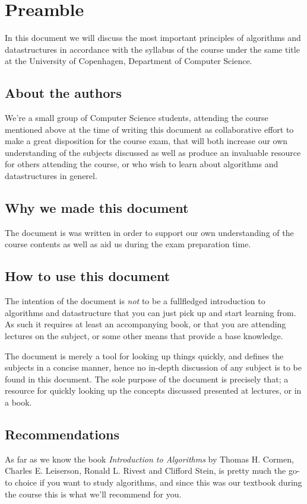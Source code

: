 
\newpage
\pagestyle{fancy}

\chapter{Preamble}
In this document we will discuss the most important principles of algorithms
and datastructures in accordance with the syllabus of the course under the
same title at the University of Copenhagen, Department of Computer Science.

\section*{About the authors}
We're a small group of Computer Science students, attending the course
mentioned above at the time of writing this document as collaborative effort
to make a great disposition for the course exam, that will both increase our
own understanding of the subjects discussed as well as produce an invaluable
resource for others attending the course, or who wish to learn about
algorithms and datastructures in generel.

\section*{Why we made this document}
The document is was written in order to support our own understanding of the
course contents as well as aid us during the exam preparation time.

\section*{How to use this document}
The intention of the document is \textit{not} to be a fullfledged introduction
to algorithms and datastructure that you can just pick up and start learning
from. As such it requires at least an accompanying book, or that you are
attending lectures on the subject, or some other means that provide a base
knowledge.

The document is merely a tool for looking up things quickly, and defines the
subjects in a concise manner, hence no in-depth discussion of any subject is
to be found in this document. The sole purpose of the document is precisely
that; a resource for quickly looking up the concepts discussed presented at
lectures, or in a book.

\section*{Recommendations}
As far as we know the book \textit{Introduction to Algorithms} by Thomas H.
Cormen, Charles E. Leiserson, Ronald L. Rivest and Clifford Stein, is pretty
much the go-to choice if you want to study algorithms, and since this was our
textbook during the course this is what we'll recommend for you.

